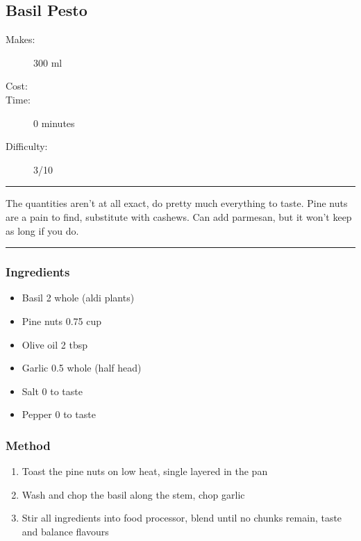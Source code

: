 \documentclass[]{article}
\begin{document}
\subsection*{\center\huge Basil Pesto}
\begin{description}
\item[Makes:] 300 ml
\item[Cost:] \textdollar
\item[Time:] 0 minutes
\item[Difficulty:] 3/10
\end{description}
\vspace{0.2cm}\hrule\vspace{0.5cm}
\begin{adjustwidth}{0.5 cm}{0.5 cm}

The quantities aren’t at all exact, do pretty much everything to taste. Pine nuts are a pain to find, substitute with cashews. Can add parmesan, but it won't keep as long if you do. \hfill\color{accent}{\Large\faVimeoSquare\hspace{0.1cm}\faGlide\hspace{0.1cm}\faTruck\hspace{0.1cm}\faHeart\hspace{0.1cm}}\color{black}

\end{adjustwidth}
\vspace{0.5cm}\hrule
\subsubsection*{\Large Ingredients}
\begin{multicols}{2}
\begin{itemize}
 \item Basil \hfill 2 whole (aldi plants)
 \item Pine nuts \hfill 0.75 cup
 \item Olive oil \hfill 2 tbsp
 \item Garlic \hfill 0.5 whole (half head)
 \item Salt \hfill 0 to taste
 \item Pepper \hfill 0 to taste
\end{itemize}
\end{multicols}
\subsubsection*{\Large Method}
\begin{enumerate}[font=\huge\color{accent}]
	\item Toast the pine nuts on low heat, single layered in the pan
	\item Wash and chop the basil along the stem, chop garlic
	\item Stir all ingredients into food processor, blend until no chunks remain, taste and balance flavours
\end{enumerate}
\newpage
{}\label{rec:Bechamel}
\end{document}
